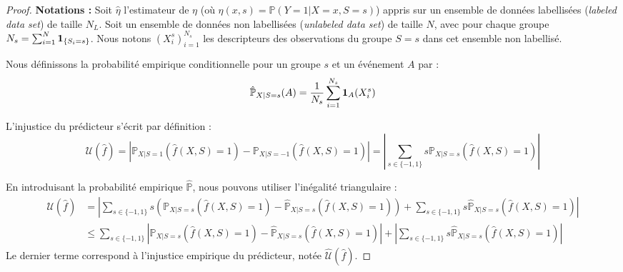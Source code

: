 \begin{proof}
    \textbf{Notations :} 
    Soit $\hat{\eta}$ l'estimateur de $\eta$ (où $\eta(x,s) = \mathbb{P}(Y=1|X=x,S=s)$) appris sur un ensemble de données labellisées (\textit{labeled data set}) de taille $N_L$.
    Soit un ensemble de données non labellisées (\textit{unlabeled data set}) de taille $N$, avec pour chaque groupe $N_s = \sum_{i=1}^N \mathbf{1}_{\{S_i = s\}}$. 
    Nous notons $(X_i^s)_{i=1}^{N_s}$ les descripteurs des observations du groupe $S=s$ dans cet ensemble non labellisé.
    
    Nous définissons la probabilité empirique conditionnelle pour un groupe $s$ et un événement $A$ par :
    \begin{equation}
        \hat{\mathbb{P}}_{X|S=s}(A) = \frac{1}{N_s} \sum_{i=1}^{N_s} \mathbf{1}_A(X_i^s)
    \end{equation}
    
    L'injustice du prédicteur s'écrit par définition :
    \begin{equation}
        \mathcal{U}(\hat{f}) = \left| \mathbb{P}_{X|S=1}(\hat{f}(X, S)=1) - \mathbb{P}_{X|S=-1}(\hat{f}(X, S)=1) \right| = \left| \sum_{s \in \{-1, 1\}} s \mathbb{P}_{X|S=s}(\hat{f}(X, S)=1) \right|
    \end{equation}
    
    En introduisant la probabilité empirique $\hat{\mathbb{P}}$, nous pouvons utiliser l'inégalité triangulaire :
    \begin{align}
        \mathcal{U}(\hat{f}) &= \left| \sum_{s \in \{-1, 1\}} s \left( \mathbb{P}_{X|S=s}(\hat{f}(X, S)=1) - \hat{\mathbb{P}}_{X|S=s}(\hat{f}(X, S)=1) \right) + \sum_{s \in \{-1, 1\}} s \hat{\mathbb{P}}_{X|S=s}(\hat{f}(X, S)=1) \right| \nonumber \\
        &\le \sum_{s \in \{-1, 1\}} \left| \mathbb{P}_{X|S=s}(\hat{f}(X, S)=1) - \hat{\mathbb{P}}_{X|S=s}(\hat{f}(X, S)=1) \right| + \left| \sum_{s \in \{-1, 1\}} s \hat{\mathbb{P}}_{X|S=s}(\hat{f}(X, S)=1) \right|
    \end{align}
    Le dernier terme correspond à l'injustice empirique du prédicteur, notée $\hat{\mathcal{U}}(\hat{f})$.
    

\end{proof}
